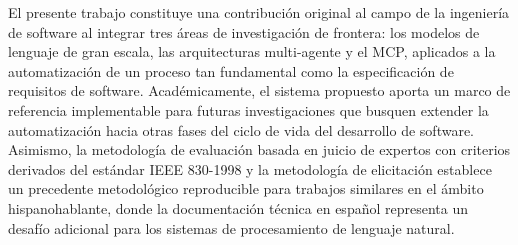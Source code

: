 El presente trabajo constituye una contribución original al campo de la ingeniería de software al integrar tres áreas de investigación de frontera: los modelos de lenguaje de gran escala, las arquitecturas multi-agente y el MCP, aplicados a la automatización de un proceso tan fundamental como la especificación de requisitos de software. Académicamente, el sistema propuesto aporta un marco de referencia implementable para futuras investigaciones que busquen extender la automatización hacia otras fases del ciclo de vida del desarrollo de software. Asimismo, la metodología de evaluación basada en juicio de expertos con criterios derivados del estándar IEEE 830-1998 y la metodología de elicitación establece un precedente metodológico reproducible para trabajos similares en el ámbito hispanohablante, donde la documentación técnica en español representa un desafío adicional para los sistemas de procesamiento de lenguaje natural. 


